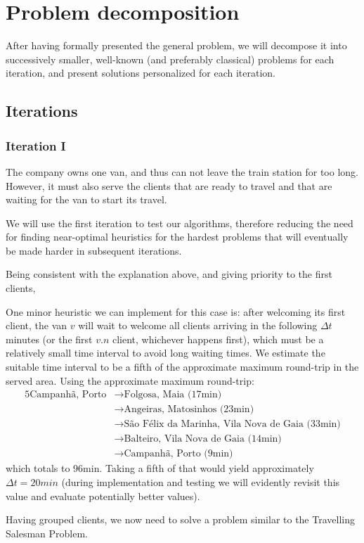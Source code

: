 \chapter{Problem decomposition} \label{problem-decomposition}
After having formally presented the general problem, we will decompose it into successively smaller, well-known (and preferably classical) problems for each iteration, and present solutions personalized for each iteration.

\section{Iterations} \label{problem-decomposition-iterations}
\subsection{Iteration I}
The company owns one van, and thus can not leave the train station for too long. However, it must also serve the clients that are ready to travel and that are waiting for the van to start its travel.\par
We will use the first iteration to test our algorithms, therefore reducing the need for finding near-optimal heuristics for the hardest problems that will eventually be made harder in subsequent iterations.\par
Being consistent with the explanation above, and giving priority to the first clients, 

One minor heuristic we can implement for this case is: after welcoming its first client, the van $v$ will wait to welcome all clients arriving in the following $\Delta t$ minutes (or the first $v.n$ client, whichever happens first), which must be a relatively small time interval to avoid long waiting times. We estimate the suitable time interval to be a fifth of the approximate maximum round-trip in the served area. Using the approximate maximum round-trip:
\begin{alignat*}{5}
    \text{Campanhã, Porto}
    &\rightarrow \text{Folgosa, Maia (17min)} \\
    &\rightarrow\text{Angeiras, Matosinhos (23min)} \\
    &\rightarrow\text{São Félix da Marinha, Vila Nova de Gaia (33min)} \\
    &\rightarrow\text{Balteiro, Vila Nova de Gaia (14min)} \\
    &\rightarrow\text{Campanhã, Porto (9min)}
\end{alignat*}
which totals to 96min. Taking a fifth of that would yield approximately $\Delta t = 20min$ (during implementation and testing we will evidently revisit this value and evaluate potentially better values).\par
Having grouped clients, we now need to solve a problem similar to the Travelling Salesman Problem.

